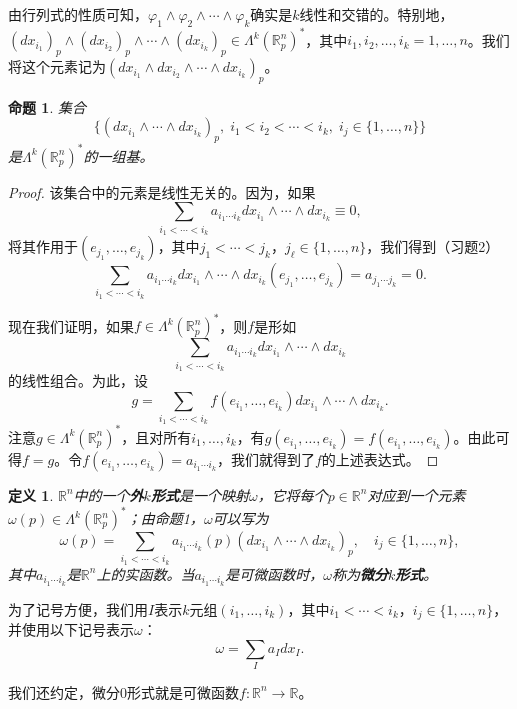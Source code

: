 \documentclass[12pt,a4paper]{ctexbook}
\newtheorem{proposition}[theorem]{命题}
\newtheorem{definition}[theorem]{定义}
\begin{document}
由行列式的性质可知，$\varphi_1\wedge\varphi_2\wedge\cdots\wedge\varphi_k$确实是$k$线性和交错的。特别地，$(dx_{i_1})_p\wedge(dx_{i_2})_p\wedge\cdots\wedge(dx_{i_k})_p\in\Lambda^k(\mathbb{R}_p^n)^*$，其中$i_1,i_2,\ldots,i_k=1,\ldots,n$。我们将这个元素记为$(dx_{i_1}\wedge dx_{i_2}\wedge\cdots\wedge dx_{i_k})_p$。

\begin{proposition}
集合
$$\{(dx_{i_1}\wedge\cdots\wedge dx_{i_k})_p,\; i_1<i_2<\cdots<i_k,\; i_j\in\{1,\ldots,n\}\}$$
是$\Lambda^k(\mathbb{R}_p^n)^*$的一组基。
\end{proposition}

\begin{proof}
该集合中的元素是线性无关的。因为，如果
$$\sum_{i_1<\cdots<i_k} a_{i_1\cdots i_k} dx_{i_1}\wedge\cdots\wedge dx_{i_k} \equiv 0,$$
将其作用于$(e_{j_1},\ldots,e_{j_k})$，其中$j_1<\cdots<j_k$，$j_\ell\in\{1,\ldots,n\}$，我们得到（习题2）
$$\sum_{i_1<\cdots<i_k} a_{i_1\cdots i_k} dx_{i_1}\wedge\cdots\wedge dx_{i_k}(e_{j_1},\ldots,e_{j_k}) = a_{j_1\cdots j_k} = 0.$$

现在我们证明，如果$f\in\Lambda^k(\mathbb{R}_p^n)^*$，则$f$是形如
$$\sum_{i_1<\cdots<i_k} a_{i_1\cdots i_k} dx_{i_1}\wedge\cdots\wedge dx_{i_k}$$
的线性组合。为此，设
$$g = \sum_{i_1<\cdots<i_k} f(e_{i_1},\ldots,e_{i_k}) dx_{i_1}\wedge\cdots\wedge dx_{i_k}.$$
注意$g\in\Lambda^k(\mathbb{R}_p^n)^*$，且对所有$i_1,\ldots,i_k$，有$g(e_{i_1},\ldots,e_{i_k})=f(e_{i_1},\ldots,e_{i_k})$。由此可得$f=g$。令$f(e_{i_1},\ldots,e_{i_k})=a_{i_1\cdots i_k}$，我们就得到了$f$的上述表达式。
\end{proof}

\begin{definition}
$\mathbb{R}^n$中的一个\textbf{外$k$形式}是一个映射$\omega$，它将每个$p\in\mathbb{R}^n$对应到一个元素$\omega(p)\in\Lambda^k(\mathbb{R}_p^n)^*$；由命题1，$\omega$可以写为
$$\omega(p) = \sum_{i_1<\cdots<i_k} a_{i_1\cdots i_k}(p)(dx_{i_1}\wedge\cdots\wedge dx_{i_k})_p,\quad i_j\in\{1,\ldots,n\},$$
其中$a_{i_1\cdots i_k}$是$\mathbb{R}^n$上的实函数。当$a_{i_1\cdots i_k}$是可微函数时，$\omega$称为\textbf{微分$k$形式}。
\end{definition}

为了记号方便，我们用$I$表示$k$元组$(i_1,\ldots,i_k)$，其中$i_1<\cdots<i_k$，$i_j\in\{1,\ldots,n\}$，并使用以下记号表示$\omega$：
$$\omega = \sum_I a_I dx_I.$$

我们还约定，微分0形式就是可微函数$f:\mathbb{R}^n\to\mathbb{R}$。
\end{document}
